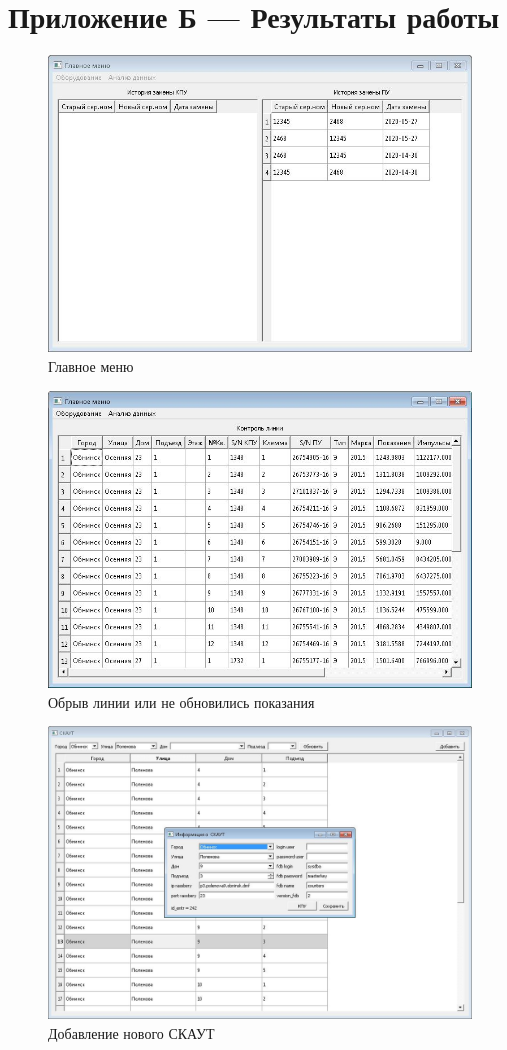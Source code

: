 \documentclass[a4paper,12pt]{article}
\begin{document}
\section*{ \centering Приложение Б --- Результаты работы} 
\begin{figure}[H]
	\centering
	\includegraphics[width=0.8\linewidth]{pics/1}
	\caption{Главное меню}
	\label{fig:1}
\end{figure}
\begin{figure}[H]
	\centering
	\includegraphics[width=0.9\linewidth]{pics/2}
	\caption{Обрыв линии или не обновились показания}
	\label{fig:2}
\end{figure}
\begin{figure}[H]
	\centering
	\includegraphics[width=0.9\linewidth]{pics/4}
	\caption{Добавление нового СКАУТ}
	\label{fig:4}
\end{figure}
\end{document}
